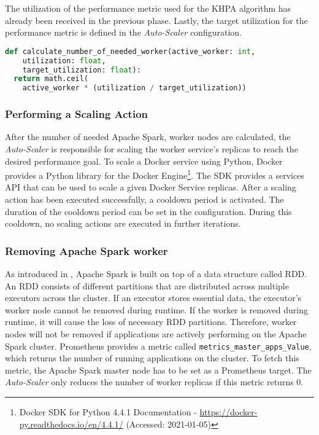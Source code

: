 The utilization of the performance metric  used for the KHPA algorithm has already been received in the previous phase. Lastly, the target utilization for the performance metric is defined in the \textit{Auto-Scaler} configuration. 
\begin{lstlisting}[label=lst:06_auto-scaler_plan_khpa, caption=KHPA implementation using Python 3.8, language=Python]
def calculate_number_of_needed_worker(active_worker: int,
    utilization: float,
    target_utilization: float):
  return math.ceil(
    active_worker * (utilization / target_utilization))
\end{lstlisting}


\subsubsection{Performing a Scaling Action}
After the number of needed Apache Spark, worker nodes are calculated, the \textit{Auto-Scaler} is responsible for scaling the worker service's replicas to reach the desired performance goal.
To scale a Docker service using Python, Docker provides a Python library for the Docker Engine\footnote{Docker SDK for Python 4.4.1 Documentation - \url{https://docker-py.readthedocs.io/en/4.4.1/} (Accessed: 2021-01-05)}. 
The SDK provides a services API that can be used to scale a given Docker Service replicas.
After a scaling action has been executed successfully, a cooldown period is activated. The duration of the cooldown period can be set in the configuration. During this cooldown, no scaling actions are executed in further iterations.


\subsubsection{Removing Apache Spark worker}
As introduced in , Apache Spark is built on top of a data structure called RDD. An RDD consists of different partitions that are distributed across multiple executors across the cluster.
If an executor stores essential data, the executor's worker node cannot be removed during runtime. If the worker is removed during runtime, it will cause the loss of necessary RDD partitions.
Therefore, worker nodes will not be removed if applications are actively performing on the Apache Spark cluster.
Prometheus provides a metric called \texttt{metrics\_master\_apps\_Value}, which returns the number of running applications on the cluster. To fetch this metric, the Apache Spark master node has to be set as a Prometheus target.
The \textit{Auto-Scaler} only reduces the number of worker replicas if this metric returns 0.


